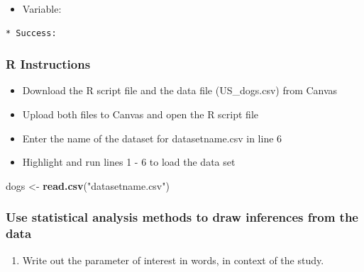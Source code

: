 \documentclass[
]{report}
\newenvironment{Shaded}{\begin{snugshade}}{\end{snugshade}}
\newcommand{\FunctionTok}[1]{\textcolor[rgb]{0.13,0.29,0.53}{\textbf{#1}}}
\newcommand{\NormalTok}[1]{#1}
\newcommand{\OtherTok}[1]{\textcolor[rgb]{0.56,0.35,0.01}{#1}}
\newcommand{\StringTok}[1]{\textcolor[rgb]{0.31,0.60,0.02}{#1}}
\providecommand{\tightlist}{%
  \setlength{\itemsep}{0pt}\setlength{\parskip}{0pt}}
\begin{document}
\begin{itemize}
\tightlist
\item
  Variable:
\end{itemize}

\vspace{1mm}

\begin{verbatim}
* Success:
\end{verbatim}

\subsubsection*{R Instructions}\label{r-instructions-2}

\begin{itemize}
\item
  Download the R script file and the data file (US\_dogs.csv) from Canvas
\item
  Upload both files to Canvas and open the R script file
\item
  Enter the name of the dataset for datasetname.csv in line 6
\item
  Highlight and run lines 1 - 6 to load the data set
\end{itemize}

\begin{Shaded}
\begin{Highlighting}[]
\NormalTok{dogs }\OtherTok{\textless{}{-}} \FunctionTok{read.csv}\NormalTok{(}\StringTok{"datasetname.csv"}\NormalTok{)}
\end{Highlighting}
\end{Shaded}

\subsubsection*{Use statistical analysis methods to draw inferences from the data}\label{use-statistical-analysis-methods-to-draw-inferences-from-the-data-2}

\begin{enumerate}
\def\labelenumi{\arabic{enumi}.}
\tightlist
\item
  Write out the parameter of interest in words, in context of the study.
\end{enumerate}

\vspace{0.5in}
\end{document}
